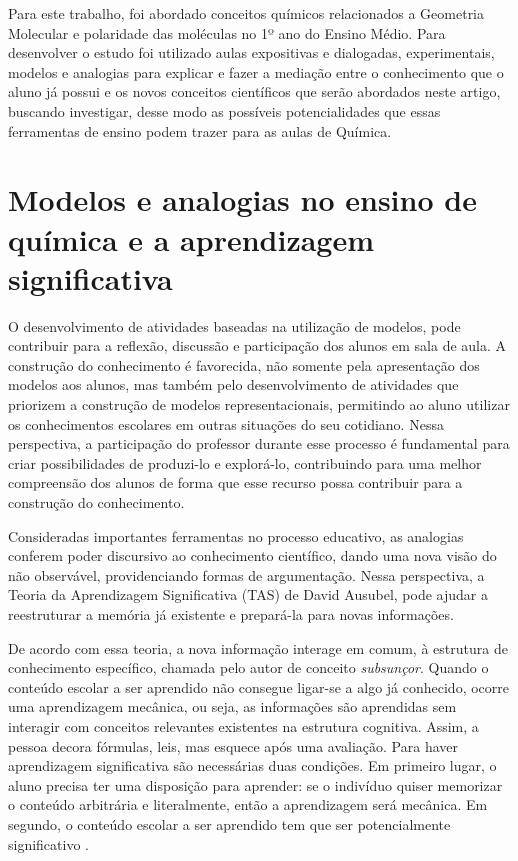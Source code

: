 \begin{refsection}
    Para este trabalho, foi abordado conceitos químicos relacionados a Geometria Molecular e polaridade das moléculas no 1º ano do Ensino Médio. Para desenvolver o estudo foi utilizado aulas expositivas e dialogadas, experimentais, modelos e analogias para explicar e fazer a mediação entre o conhecimento que o aluno já possui e os novos conceitos científicos que serão abordados neste artigo, buscando investigar, desse modo as possíveis potencialidades que essas ferramentas de ensino podem trazer para as aulas de Química.

    \section{Modelos e analogias no ensino de química e a aprendizagem significativa}

    O desenvolvimento de atividades baseadas na utilização de modelos, pode contribuir para a reflexão, discussão e participação dos alunos em sala de aula. A construção do conhecimento é favorecida, não somente pela apresentação dos modelos aos alunos, mas também pelo desenvolvimento de atividades que priorizem a construção de modelos representacionais, permitindo ao aluno utilizar os conhecimentos escolares em outras situações do seu cotidiano. Nessa perspectiva, a participação do professor durante esse processo é fundamental para criar possibilidades de produzi-lo e explorá-lo, contribuindo para uma melhor compreensão dos alunos de forma que esse recurso possa contribuir para a construção do conhecimento. 

    Consideradas importantes ferramentas no processo educativo, as analogias conferem poder discursivo ao conhecimento científico, dando uma nova visão do não observável, providenciando formas de argumentação. Nessa perspectiva, a Teoria da Aprendizagem Significativa (TAS) de David Ausubel, pode ajudar a reestruturar a memória já existente e prepará-la para novas informações.  

    De acordo com essa teoria, a nova informação interage em comum, à estrutura de conhecimento específico, chamada pelo autor de conceito \textit{subsunçor}. Quando o conteúdo escolar a ser aprendido não consegue ligar-se a algo já conhecido, ocorre uma aprendizagem mecânica, ou seja, as informações são aprendidas sem interagir com conceitos relevantes existentes na estrutura cognitiva. Assim, a pessoa decora fórmulas, leis, mas esquece após uma avaliação. Para haver aprendizagem significativa são necessárias duas condições. Em primeiro lugar, o aluno precisa ter uma disposição para aprender: se o indivíduo quiser memorizar o conteúdo arbitrária e literalmente, então a aprendizagem será mecânica. Em segundo, o conteúdo escolar a ser aprendido tem que ser potencialmente significativo \cite{AUSUBEL2000The}. 


\end{refsection}
